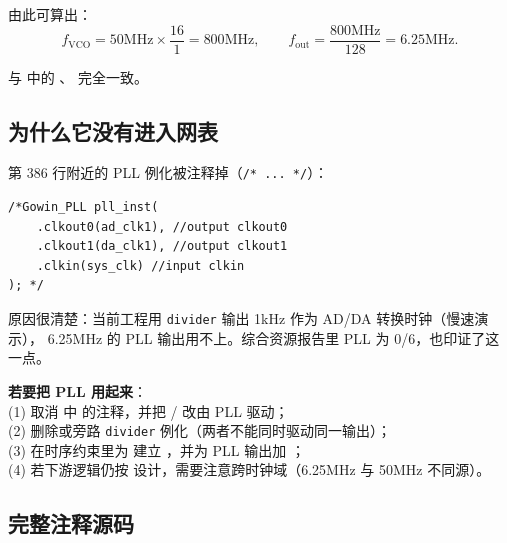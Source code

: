 由此可算出：
\begin{equation}
f_{\text{VCO}} = 50\text{MHz}\times\frac{16}{1}=800\text{MHz},\qquad
f_{\text{out}} = \frac{800\text{MHz}}{128}=6.25\text{MHz}.
\end{equation}

与  中的 、
 完全一致。

\subsection{为什么它没有进入网表}

 第 386 行附近的 PLL 例化被注释掉（\verb|/* ... */|）：

\begin{lstlisting}[style=vsnip]
/*Gowin_PLL pll_inst(
    .clkout0(ad_clk1), //output clkout0
    .clkout1(da_clk1), //output clkout1
    .clkin(sys_clk) //input clkin
); */
\end{lstlisting}

原因很清楚：当前工程用 \texttt{divider} 输出 1kHz 作为 AD/DA 转换时钟（慢速演示），
6.25MHz 的 PLL 输出用不上。综合资源报告里 PLL 为 0/6，也印证了这一点。

\begin{tipbox}
\textbf{若要把 PLL 用起来}：\\
(1) 取消  中  的注释，并把 / 改由 PLL 驱动；\\
(2) 删除或旁路 \texttt{divider} 例化（两者不能同时驱动同一输出）；\\
(3) 在时序约束里为  建立 ，并为 PLL 输出加
；\\
(4) 若下游逻辑仍按  设计，需要注意跨时钟域（6.25MHz 与 50MHz 不同源）。
\end{tipbox}

\subsection{完整注释源码}


